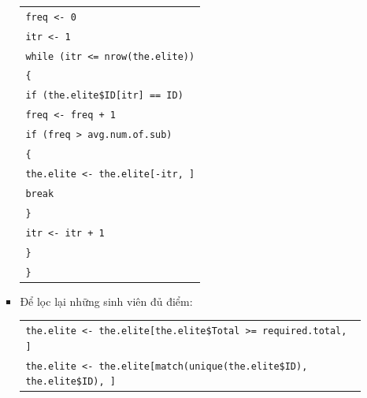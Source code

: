 \documentclass[a4paper]{article}
\theoremstyle{definition}
\begin{document}
\begin{enumerate}[a)]
\begin{itemize}
\begin{itemize}
\begin{center}
\begin{tabular}{p{13cm}}
                    \hspace{0.5cm} \texttt{freq <- 0} \\
                    \hspace{0.5cm} \texttt{itr <- 1} \\
                    \hspace{0.5cm} \texttt{while (itr <= nrow(the.elite))} \\
                    \hspace{0.5cm} \texttt{\{} \\
                    \hspace{1cm} \texttt{if (the.elite\$ID[itr] == ID)}\\
                    \hspace{1.5cm} \texttt{freq <- freq + 1} \\
                    \hspace{1cm} \texttt{if (freq > avg.num.of.sub)} \\
                    \hspace{1cm} \texttt{\{} \\
                    \hspace{1.5cm} \texttt{the.elite <- the.elite[-itr, ]} \\
                    \hspace{1.5cm} \texttt{break} \\
                    \hspace{1cm} \texttt{\}} \\
                    \hspace{1cm} \texttt{itr <- itr + 1} \\
                    \hspace{0.5cm}\texttt{\}} \\
                    \texttt{\}}
                \end{tabular}
            \end{center}
            \item Để lọc lại những sinh viên đủ điểm:
            \begin{center}
                \begin{tabular}{p{13cm}}
                    \texttt{the.elite <- the.elite[the.elite\$Total >= required.total, ]} \\
                    \texttt{the.elite <- the.elite[match(unique(the.elite\$ID), the.elite\$ID), ]}
                \end{tabular}
            \end{center}

\end{itemize}
\end{itemize}
\end{enumerate}
\end{document}

